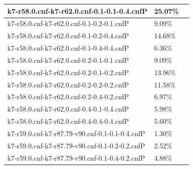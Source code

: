 \documentclass[12pt,a4paper,twoside]{scrartcl}
\numberwithin{equation}{section}
\begin{document}
\begin{table}[H]
\begin{center}
\begin{tabular}{|l|l|p{1cm}|}
k7-r58.0.cnf-k7-r62.0.cnf-0.1-0.1-0.4.cnfP&	25.07\%\\  \hline
k7-r58.0.cnf-k7-r62.0.cnf-0.1-0.2-0.1.cnfP&	9.09\%\\  \hline
k7-r58.0.cnf-k7-r62.0.cnf-0.1-0.2-0.4.cnfP&	14.68\%\\  \hline
k7-r58.0.cnf-k7-r62.0.cnf-0.1-0.4-0.4.cnfP&	6.36\%\\  \hline
k7-r58.0.cnf-k7-r62.0.cnf-0.2-0.1-0.1.cnfP&	9.09\%\\  \hline
k7-r58.0.cnf-k7-r62.0.cnf-0.2-0.1-0.2.cnfP&	13.96\%\\  \hline
k7-r58.0.cnf-k7-r62.0.cnf-0.2-0.2-0.2.cnfP&	11.58\%\\  \hline
k7-r58.0.cnf-k7-r62.0.cnf-0.2-0.4-0.2.cnfP&	6.97\%\\  \hline
k7-r58.0.cnf-k7-r62.0.cnf-0.4-0.1-0.4.cnfP&	5.98\%\\  \hline
k7-r58.0.cnf-k7-r62.0.cnf-0.4-0.4-0.4.cnfP&	5.60\%\\  \hline
k7-r59.0.cnf-k7-r87.79-v90.cnf-0.1-0.1-0.4.cnfP&	1.30\%\\  \hline
k7-r59.0.cnf-k7-r87.79-v90.cnf-0.1-0.2-0.2.cnfP&	2.52\%\\  \hline
k7-r59.0.cnf-k7-r87.79-v90.cnf-0.1-0.4-0.2.cnfP&	4.88\%\\  \hline
\end{tabular}
\end{center}
\end{table} 
\end{document}
